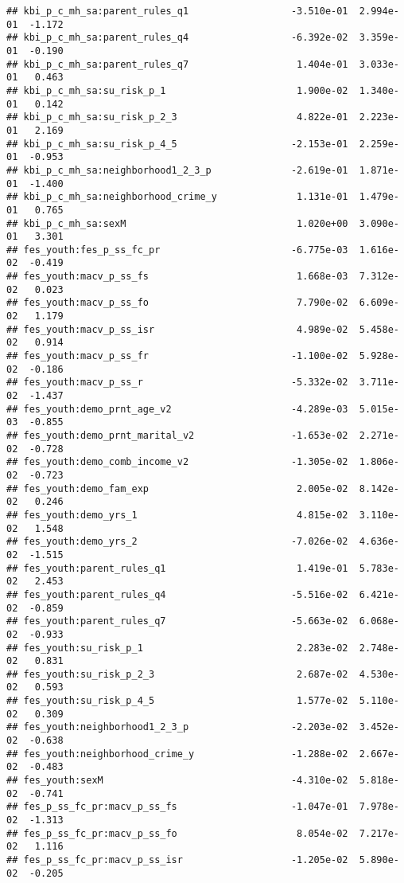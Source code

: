\documentclass[
]{article}
\begin{document}
\begin{verbatim}
## kbi_p_c_mh_sa:parent_rules_q1                  -3.510e-01  2.994e-01  -1.172
## kbi_p_c_mh_sa:parent_rules_q4                  -6.392e-02  3.359e-01  -0.190
## kbi_p_c_mh_sa:parent_rules_q7                   1.404e-01  3.033e-01   0.463
## kbi_p_c_mh_sa:su_risk_p_1                       1.900e-02  1.340e-01   0.142
## kbi_p_c_mh_sa:su_risk_p_2_3                     4.822e-01  2.223e-01   2.169
## kbi_p_c_mh_sa:su_risk_p_4_5                    -2.153e-01  2.259e-01  -0.953
## kbi_p_c_mh_sa:neighborhood1_2_3_p              -2.619e-01  1.871e-01  -1.400
## kbi_p_c_mh_sa:neighborhood_crime_y              1.131e-01  1.479e-01   0.765
## kbi_p_c_mh_sa:sexM                              1.020e+00  3.090e-01   3.301
## fes_youth:fes_p_ss_fc_pr                       -6.775e-03  1.616e-02  -0.419
## fes_youth:macv_p_ss_fs                          1.668e-03  7.312e-02   0.023
## fes_youth:macv_p_ss_fo                          7.790e-02  6.609e-02   1.179
## fes_youth:macv_p_ss_isr                         4.989e-02  5.458e-02   0.914
## fes_youth:macv_p_ss_fr                         -1.100e-02  5.928e-02  -0.186
## fes_youth:macv_p_ss_r                          -5.332e-02  3.711e-02  -1.437
## fes_youth:demo_prnt_age_v2                     -4.289e-03  5.015e-03  -0.855
## fes_youth:demo_prnt_marital_v2                 -1.653e-02  2.271e-02  -0.728
## fes_youth:demo_comb_income_v2                  -1.305e-02  1.806e-02  -0.723
## fes_youth:demo_fam_exp                          2.005e-02  8.142e-02   0.246
## fes_youth:demo_yrs_1                            4.815e-02  3.110e-02   1.548
## fes_youth:demo_yrs_2                           -7.026e-02  4.636e-02  -1.515
## fes_youth:parent_rules_q1                       1.419e-01  5.783e-02   2.453
## fes_youth:parent_rules_q4                      -5.516e-02  6.421e-02  -0.859
## fes_youth:parent_rules_q7                      -5.663e-02  6.068e-02  -0.933
## fes_youth:su_risk_p_1                           2.283e-02  2.748e-02   0.831
## fes_youth:su_risk_p_2_3                         2.687e-02  4.530e-02   0.593
## fes_youth:su_risk_p_4_5                         1.577e-02  5.110e-02   0.309
## fes_youth:neighborhood1_2_3_p                  -2.203e-02  3.452e-02  -0.638
## fes_youth:neighborhood_crime_y                 -1.288e-02  2.667e-02  -0.483
## fes_youth:sexM                                 -4.310e-02  5.818e-02  -0.741
## fes_p_ss_fc_pr:macv_p_ss_fs                    -1.047e-01  7.978e-02  -1.313
## fes_p_ss_fc_pr:macv_p_ss_fo                     8.054e-02  7.217e-02   1.116
## fes_p_ss_fc_pr:macv_p_ss_isr                   -1.205e-02  5.890e-02  -0.205

\end{verbatim}
\end{document}
